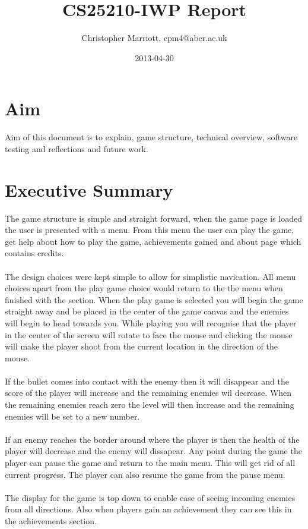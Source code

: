 \documentclass{article}
\title{CS25210-IWP Report}
\date{2013-04-30}
\author{Christopher Marriott, cpm4@aber.ac.uk}
\begin{document}
\maketitle
\newpage
\tableofcontents
\newpage

\section{Aim}
Aim of this document is to explain, game structure, technical overview, software testing and reflections and future work.

\section{Executive Summary}
The game structure is simple and straight forward, when the game page is loaded the user is presented with a menu. From this menu the user can play the game, get help about how to play the game, achievements gained and about page which contains credits.
\\\\
The design choices were kept simple to allow for simplistic navication. All menu choices apart from the play game choice would return to the the menu when finished with the section. When the play game is selected you will begin the game straight away and be placed in the center of the game canvas and the enemies will begin to head towards you. While playing you will recognise that the player in the center of the screen will rotate to face the mouse and clicking the mouse will make the player shoot from the current location in the direction of the mouse.
\\\\
If the bullet comes into contact with the enemy then it will disappear and the score of the player will increase and the remaining enemies wil decrease. When the remaining enemies reach zero the level will then increase and the remaining enemies will be set to a new number.
\\\\
If an enemy reaches the border around where the player is then the health of the player will decrease and the enemy will dissapear. Any point during the game the player can pause the game and return to the main menu. This will get rid of all current progress. The player can also resume the game from the pause menu.
\\\\
The display for the game is top down to enable ease of seeing incoming enemies from all directions. Also when players gain an achievement they can see this in the achievements section.
\end{document}
